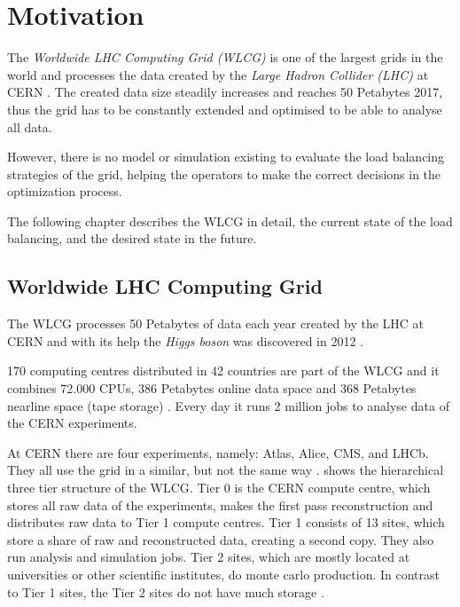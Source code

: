 
\chapter{Motivation}
The \textit{Worldwide LHC Computing Grid (WLCG)} is one of the largest grids in the world and processes the data created by the \textit{Large Hadron Collider (LHC)} at CERN \cite{wlcg_update}. 
The created data size steadily increases and reaches 50 Petabytes 2017, thus the grid has to be constantly extended and optimised to be able to analyse all data.

However, there is no model or simulation existing to evaluate the load balancing strategies of the grid,
helping the operators to make the correct decisions in the optimization process.

The following chapter describes the WLCG in detail, the current state of the load balancing, and the desired state in the future.

\section{Worldwide LHC Computing Grid}

The WLCG processes 50 Petabytes of data each year created by the LHC at CERN \cite{data_process}
and with its help the \textit{Higgs boson} was discovered in 2012 \cite{wlcg_online}.

170 computing centres distributed in 42 countries are part of the WLCG and it combines 72.000 CPUs, 386 Petabytes online data space and 368 Petabytes nearline space (tape storage) \cite{wlcg_data}. Every day it runs 2 million jobs to analyse data of the CERN experiments.

At CERN there are four experiments, namely: Atlas, Alice, CMS, and LHCb. They all use the grid in a similar, but not the same way \cite{wlcg_computing}.  shows the hierarchical three tier structure of the WLCG. Tier 0 is the CERN compute centre, which stores all raw data of the experiments, makes the first pass reconstruction and distributes raw data to Tier 1 compute centres. Tier 1 consists of 13 sites, which store a share of raw and reconstructed data, creating a second copy. They also run analysis and simulation jobs. Tier 2 sites, which are mostly located at universities or other scientific institutes, do monte carlo production. In contrast to Tier 1 sites, the Tier 2 sites do not have much storage \cite{wlcg_computing}.

